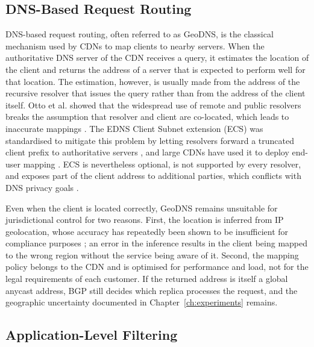 \subsection{DNS-Based Request Routing}
\label{sc:rcadns_related_geodns}

DNS-based request routing, often referred to as GeoDNS, is the classical mechanism used by CDNs to map clients to nearby servers. When the authoritative DNS server of the CDN receives a query, it estimates the location of the client and returns the address of a server that is expected to perform well for that location. The estimation, however, is usually made from the address of the recursive resolver that issues the query rather than from the address of the client itself. Otto et al. showed that the widespread use of remote and public resolvers breaks the assumption that resolver and client are co-located, which leads to inaccurate mappings \cite{Otto2012ContentSolutions}. The EDNS Client Subnet extension (ECS) was standardised to mitigate this problem by letting resolvers forward a truncated client prefix to authoritative servers \cite{Contavalli2016ClientQueries}, and large CDNs have used it to deploy end-user mapping \cite{Chen2015End-UserDelivery}. ECS is nevertheless optional, is not supported by every resolver, and exposes part of the client address to additional parties, which conflicts with DNS privacy goals \cite{Bortzmeyer2015DNSConsiderations}.

Even when the client is located correctly, GeoDNS remains unsuitable for jurisdictional control for two reasons. First, the location is inferred from IP geolocation, whose accuracy has repeatedly been shown to be insufficient for compliance purposes \cite{Poese2011IPUnreliable, Cozar2022ReliabilityTransfers}; an error in the inference results in the client being mapped to the wrong region without the service being aware of it. Second, the mapping policy belongs to the CDN and is optimised for performance and load, not for the legal requirements of each customer. If the returned address is itself a global anycast address, BGP still decides which replica processes the request, and the geographic uncertainty documented in Chapter~\ref{ch:experiments} remains.

\subsection{Application-Level Filtering}
\label{sc:rcadns_related_filtering}

